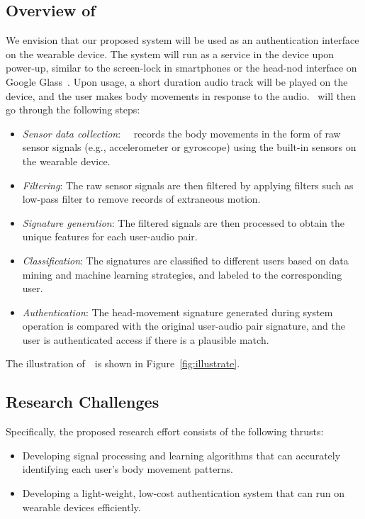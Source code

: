 \subsection{Overview of ~\systemname}
We envision that our proposed system will be used as an authentication interface on the wearable device.  The system will run as a service in the device upon power-up, similar to the screen-lock in smartphones or the head-nod interface on Google
Glass~\cite{googleglass}. Upon usage, a short duration audio track
will be played on the device, and the user makes body movements in
response to the audio. ~\systemname will then go through the following steps:
\begin{itemize}
\item {\em Sensor data collection}: ~\systemname~records the body movements
in the form of raw sensor signals (e.g., accelerometer or gyroscope) using the built-in
sensors on the wearable device.

\item {\em Filtering}: The raw sensor signals are then filtered by applying filters such as low-pass filter to remove records of extraneous motion.

\item {\em Signature generation}: The filtered signals are then
processed to obtain the unique features for each user-audio pair.


\item {\em Classification}: The signatures are classified
to different users based on data mining and machine learning strategies, and
labeled to the corresponding user.

\item {\em Authentication}: The head-movement signature generated
during system operation is compared with the original user-audio pair
signature, and the user is authenticated access if there is a plausible match.
\end{itemize}

The illustration of~\systemname~is shown in Figure~\ref{fig:illustrate}.




\subsection{Research Challenges}
Specifically, the proposed research effort consists of the following thrusts:
\begin{itemize}
\item Developing signal processing and learning algorithms that can accurately identifying each user's body movement patterns.

\item Developing a light-weight, low-cost authentication system that can run on wearable devices efficiently.

\end{itemize}
